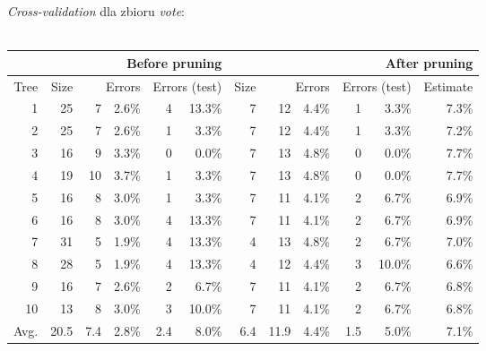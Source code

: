 \documentclass{article}
\begin{document}
\begin{itemize}
\emph{Cross-validation} dla zbioru \emph{vote}:\\\\
\begin{tabular}{|r||r|rr|rr||r|rr|rr|r|}
\hline
&\multicolumn{5}{1||}{Before pruning}&\multicolumn{6}{1|}{After pruning} \\
\hline
Tree & 
Size & 
\multicolumn{2}{1|}{Errors} & 
\multicolumn{2}{1||}{Errors (test)} & 
Size & 
\multicolumn{2}{1|}{Errors} & 
\multicolumn{2}{1|}{Errors (test)} & 
Estimate \\
\hline\hline
    1 &   25 &    7 & 2.6\% &    4 & 13.3\% &    7 &   12 & 4.4\% &    1 &  3.3\%  &   7.3\%  \\
    2 &   25 &    7 & 2.6\% &    1 &  3.3\% &    7 &   12 & 4.4\% &    1 &  3.3\%  &   7.2\%  \\
    3 &   16 &    9 & 3.3\% &    0 &  0.0\% &    7 &   13 & 4.8\% &    0 &  0.0\%  &   7.7\%  \\
    4 &   19 &   10 & 3.7\% &    1 &  3.3\% &    7 &   13 & 4.8\% &    0 &  0.0\%  &   7.7\%  \\
    5 &   16 &    8 & 3.0\% &    1 &  3.3\% &    7 &   11 & 4.1\% &    2 &  6.7\%  &   6.9\%  \\
    6 &   16 &    8 & 3.0\% &    4 & 13.3\% &    7 &   11 & 4.1\% &    2 &  6.7\%  &   6.9\%  \\
    7 &   31 &    5 & 1.9\% &    4 & 13.3\% &    4 &   13 & 4.8\% &    2 &  6.7\%  &   7.0\%  \\
    8 &   28 &    5 & 1.9\% &    4 & 13.3\% &    4 &   12 & 4.4\% &    3 & 10.0\%  &   6.6\%  \\
    9 &   16 &    7 & 2.6\% &    2 &  6.7\% &    7 &   11 & 4.1\% &    2 &  6.7\%  &   6.8\%  \\
   10 &   13 &    8 & 3.0\% &    3 & 10.0\% &    7 &   11 & 4.1\% &    2 &  6.7\%  &   6.8\%  \\
\hline\hline
 Avg. & 20.5 &  7.4 & 2.8\% &  2.4 & 8.0\%  &  6.4 & 11.9 & 4.4\% &  1.5 &  5.0\%  &   7.1\%  \\
\hline
\end{tabular}


\end{itemize}
\end{document}
